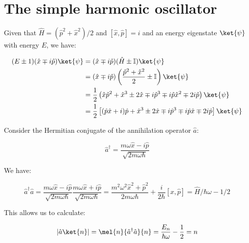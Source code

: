 \documentclass[12pt]{article}
\begin{document}



\pagebreak
\section*{The simple harmonic oscillator}


Given that $\hat{H} = (\hat{p}^2 + \hat{x}^2)/2$ and $[\hat{x}, \hat{p}] = i$ and an energy eigenstate $\ket{\psi}$ with energy $E$, we have:

\begin{equation}
    \begin{split}
        (E \pm 1) (\hat{x} \mp i\hat{p}) \ket{\psi} &= (\hat{x} \mp i\hat{p}) (\hat{H} \pm \mathbb{I}) \ket{\psi} \\
        &= (\hat{x} \mp i\hat{p}) \left( \frac{\hat{p}^{2} + \hat{x}^{2}}{2} \pm \mathbb{I} \right) \ket{\psi} \\
        &= \frac{1}{2} \left( \hat{x} \hat{p}^{2} + \hat{x}^{3} \pm 2\hat{x} \mp i \hat{p}^{3} \mp i\hat{p} \hat{x}^{2} \mp 2i\hat{p} \right) \ket{\psi} \\
        &= \frac{1}{2} \left[ (\hat{p} \hat{x} + i) \hat{p} + \hat{x}^{3} \pm 2\hat{x} \mp i \hat{p}^{3} \mp i\hat{p} \hat{x} \mp 2i\hat{p} \right] \ket{\psi} \\
    \end{split}
\end{equation}


Consider the Hermitian conjugate of the annihilation operator $\hat{a}$:

\begin{equation}
    \hat{a}^{\dagger} = \frac{m\omega \hat{x} - i \hat{p}}{\sqrt{2m\omega \hbar}}
\end{equation}

We have:

\begin{equation}
    \hat{a}^{\dagger} \hat{a} = \frac{m\omega \hat{x} - i \hat{p}}{\sqrt{2m\omega \hbar}} \frac{m\omega \hat{x} + i \hat{p}}{\sqrt{2m\omega \hbar}} = \frac{m^2 \omega^2 \hat{x}^2 + \hat{p}^2}{2m\omega \hbar} + \frac{i}{2\hbar} [\hat{x}, \hat{p}] = \hat{H}/\hbar \omega - 1/2
\end{equation}

This allows us to calculate:

\begin{equation}
    \left\lvert \hat{a}\ket{n} \right\rvert = \mel{n}{\hat{a}^{\dagger} \hat{a}}{n} = \frac{E_{n}}{\hbar \omega} - \frac{1}{2} = n
\end{equation}
\end{document}
